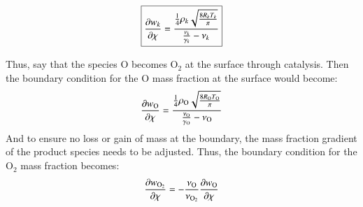 \documentclass{warpdoc}
\newcommand\frameeqn[1]{\fbox{$\displaystyle #1$}}
\begin{document}
%
\begin{equation}
\frameeqn{
 \frac{\partial w_k}{\partial \chi}  = \frac{\frac{1}{4} \rho_k \sqrt{\frac{8 R_k T_k}{\pi}} }{ \frac{\nu_k }{\gamma_k} - \nu_k}
}
\end{equation}
%

Thus, say that the species O becomes O$_2$ at the surface through catalysis. Then the boundary condition for the O mass fraction at the surface would become:
%
\begin{equation}
 \frac{\partial w_{\rm O}}{\partial \chi}  = \frac{\frac{1}{4} \rho_{\rm O} \sqrt{\frac{8 R_{\rm O} T_{\rm O}}{\pi}} }{ \frac{\nu_{\rm O} }{\gamma_{\rm O}} - \nu_{\rm O}}
\end{equation}
%
And to ensure no loss or gain of mass at the boundary, the mass fraction gradient of the product species needs to be adjusted. Thus, the boundary condition for the O$_2$ mass fraction becomes:
%
\begin{equation}
 \frac{\partial w_{\rm O_2}}{\partial \chi}  = -\frac{{\nu}_{\rm O}}{{\nu}_{\rm O_2}} \frac{\partial w_{\rm O}}{\partial \chi}
\end{equation}
%
\end{document}
